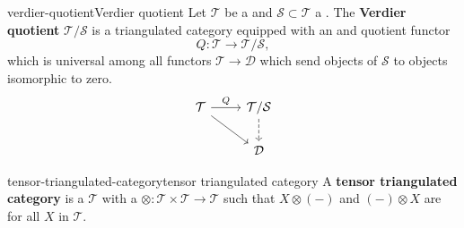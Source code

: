 \begin{topic}{verdier-quotient}{Verdier quotient}
    Let $\mathcal{T}$ be a  and $\mathcal{S} \subset \mathcal{T}$ a . The \textbf{Verdier quotient} $\mathcal{T}/\mathcal{S}$ is a triangulated category equipped with an  and  quotient functor
    \[ Q : \mathcal{T} \to \mathcal{T}/\mathcal{S} , \]
    which is universal among all functors $\mathcal{T} \to \mathcal{D}$ which send objects of $\mathcal{S}$ to objects isomorphic to zero.
    \[ \begin{tikzcd} \mathcal{T} \arrow{r}{Q} \arrow{rd} & \mathcal{T} / \mathcal{S} \arrow[dashed]{d} \\ & \mathcal{D} \end{tikzcd} \]
\end{topic}

\begin{topic}{tensor-triangulated-category}{tensor triangulated category}
    A \textbf{tensor triangulated category} is a  $\mathcal{T}$ with a  $\otimes : \mathcal{T} \times \mathcal{T} \to \mathcal{T}$ such that $X \otimes (-)$ and $(-) \otimes X$ are  for all $X$ in $\mathcal{T}$.
\end{topic}
